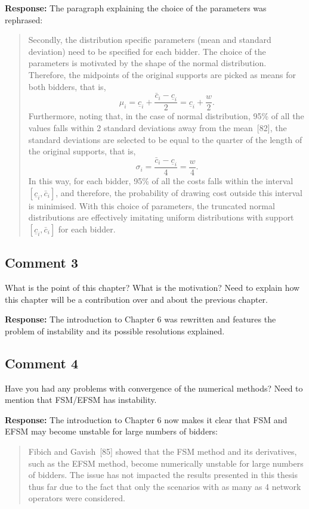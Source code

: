 \documentclass[10pt,a4paper,notitlepage]{article}
\numberwithin{equation}{section}
\begin{document}
\textbf{Response:}
The paragraph explaining the choice of the parameters was rephrased:
\begin{quote}
Secondly, the distribution specific parameters (mean and standard deviation) need to be specified for each bidder. The choice of the parameters is motivated by the shape of the normal distribution. Therefore, the midpoints of the original supports are picked as means for both bidders, that is,
\begin{equation}
\mu_i = \underline{c}_i + \frac{\bar{c}_i - \underline{c}_i}{2} = \underline{c}_i + \frac{w}{2}.
\end{equation}
Furthermore, noting that, in the case of normal distribution, 95\% of all the values falls within 2 standard deviations away from the mean~[82], the standard deviations are selected to be equal to the quarter of the length of the original supports, that is,
\begin{equation}
\sigma_i = \frac{\bar{c}_i - \underline{c}_i}{4} = \frac{w}{4}.
\end{equation}
In this way, for each bidder, 95\% of all the costs falls within the interval $[\underline{c}_i, \bar{c}_i]$, and therefore, the probability of drawing cost outside this interval is minimised. With this choice of parameters, the truncated normal distributions are effectively imitating uniform distributions with support $[\underline{c}_i, \bar{c}_i]$ for each bidder.
\end{quote}

\subsection{Comment 3}
What is the point of this chapter? What is the motivation? Need to explain how this chapter will be a contribution over and about the previous chapter.

\textbf{Response:}
The introduction to Chapter 6 was rewritten and features the problem of instability and its possible resolutions explained.

\subsection{Comment 4}
Have you had any problems with convergence of the numerical methods? Need to mention that FSM/EFSM has instability.

\textbf{Response:}
The introduction to Chapter 6 now makes it clear that FSM and EFSM may become unstable for large numbers of bidders:
\begin{quote}
Fibich and Gavish~[85] showed that the FSM method and its derivatives, such as the EFSM method, become numerically unstable for large numbers of bidders. The issue has not impacted the results presented in this thesis thus far due to the fact that only the scenarios with as many as 4 network operators were considered.
\end{quote}
\end{document}
